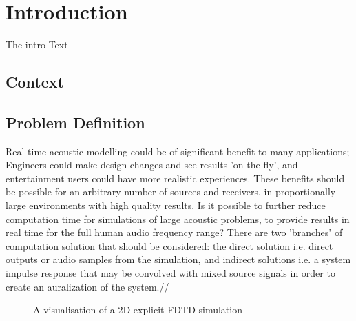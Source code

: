 \chapter{Introduction}

The intro Text

\section{Context}

\section{Problem Definition}
Real time acoustic modelling could be of significant benefit to many applications; Engineers could make design changes and see results 'on the fly', and entertainment users could have more realistic experiences. These benefits should be possible for an arbitrary number of sources and receivers, in proportionally large environments with high quality results. Is it possible to further reduce computation time for simulations of large acoustic problems, to provide results in real time for the full human audio frequency range? There are two 'branches' of computation solution that should be considered: the direct solution i.e. direct outputs or audio samples from the simulation, and indirect solutions i.e. a system impulse response that may be convolved with mixed source signals in order to create an auralization of the system.//


\begin{figure}
\centering
\centering
\caption{A visualisation of a 2D explicit FDTD simulation ~\cite{Durbridge2016a}}
\end{figure}
